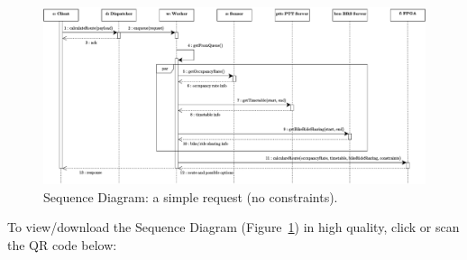 \documentclass[a4paper]{article}
\begin{document}
    \begin{figure}[!htp]
        \centering
        \includegraphics[width=\textwidth]{img/sequence-diagram-1.pdf}
        \caption{Sequence Diagram: a simple request (no constraints).}
        \label{fig: Sequence Diagram: a simple request (no constraints)}
    \end{figure}

    \noindent
    To view/download the Sequence Diagram (Figure~\ref{fig: Sequence Diagram: a simple request (no constraints)}) in high quality, click or scan the QR code below:
    \begin{center}
    \end{center}
\end{document}
